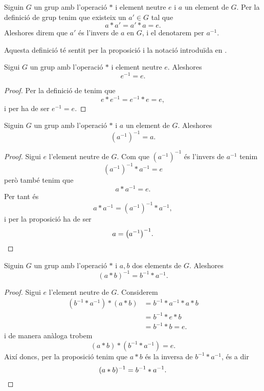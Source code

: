 \documentclass[../Apunts.tex]{subfiles}
\begin{document}
	\begin{definition}
		\label{def:l'invers d'un element d'un grup}
		Siguin \(G\) un grup amb l'operació \(\ast\) i element neutre \(e\) i \(a\) un element de \(G\). Per la definició de grup tenim que existeix un \(a'\in G\) tal que
		\[a\ast a'=a'\ast a=e.\]
		Aleshores direm que \(a'\) és l'invers de \(a\) en \(G\), i el denotarem per \(a^{-1}\).
		
		Aquesta definició té sentit per la proposició  i la notació introduïda en .
	\end{definition}
	\begin{proposition}
		\label{prop:l'invers de l'element neutre d'un grup és ell mateix}
		Sigui \(G\) un grup amb l'operació \(\ast\) i element neutre \(e\). Aleshores
		\[e^{-1}=e.\]
		\begin{proof}
			Per la definició de  tenim que
			\[e\ast e^{-1}=e^{-1}\ast e=e,\]
			i per ha de ser \(e^{-1}=e\).
		\end{proof}
	\end{proposition}
	\begin{proposition}
		\label{prop:grups:l'invers de l'invers d'un element es l'element}
		Siguin \(G\) un grup amb l'operació \(\ast\) i \(a\) un element de \(G\). Aleshores
		\[\left(a^{-1}\right)^{-1}=a.\]
		\begin{proof}
			Sigui \(e\) l'element neutre de \(G\). Com que \(\left(a^{-1}\right)^{-1}\) és l'invers de \(a^{-1}\) tenim
			\[\left(a^{-1}\right)^{-1}\ast a^{-1}=e\]
			però també tenim que
			\[a\ast a^{-1}=e.\]
			Per tant és
			\[a\ast a^{-1}=(a^{-1})^{-1}\ast a^{-1},\]
			i per la proposició  ha de ser
			\[a=\left(a^{-1}\right)^{-1}.\qedhere\]
		\end{proof}
	\end{proposition}
	\begin{proposition}
		\label{prop:invers de a b = b invers a invers}
		Siguin \(G\) un grup amb l'operació \(\ast\) i \(a,b\) dos elements de \(G\). Aleshores
		\[(a\ast b)^{-1}=b^{-1}\ast a^{-1}.\]
		\begin{proof}
			Sigui \(e\) l'element neutre de \(G\). Considerem
			\begin{align*}
			(b^{-1}\ast a^{-1})\ast(a\ast b)&=b^{-1}\ast a^{-1}\ast a\ast b\\
			&=b^{-1}\ast e\ast b\\
			&=b^{-1}\ast b=e.
			\end{align*}
			i de manera anàloga trobem
			\[(a\ast b)\ast(b^{-1}\ast a^{-1})=e.\]
			Així doncs, per la proposició  tenim que \(a\ast b\) és la inversa de \(b^{-1}\ast a^{-1}\), és a dir
			\[(a\ast b)^{-1}=b^{-1}\ast a^{-1}.\qedhere\]
		\end{proof}
	\end{proposition}
\end{document}
